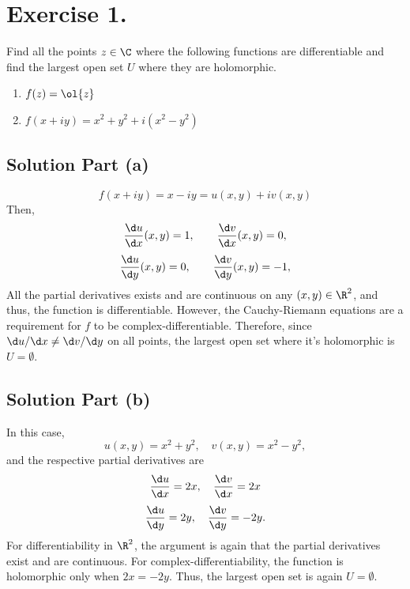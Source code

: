 \section*{Exercise 1.}

Find all the points $z\in\C$ where the following functions are differentiable and find the largest open set $U$ where they are holomorphic.
\begin{enumerate}[label=(\alph*)]
    \item $f(z) = \ol{z}$
    \item $ f(x+iy) = x^2 + y^2 + i(x^2 - y^2)$
\end{enumerate}

\subsection*{Solution Part (a)}

\[ f(x+iy) = x-iy = u(x,y) + i v(x,y) \]
Then,
\[ \frac{\d u}{\d x}(x,y) = 1,\hspace{2em} \frac{\d v}{\d x}(x,y) = 0, \]
\[ \frac{\d u}{\d y}(x,y) = 0,\hspace{2em} \frac{\d v}{\d y}(x,y) = -1, \]
All the partial derivatives exists and are continuous on any $(x,y)\in\R^2$, and thus, the function is differentiable. However, the Cauchy-Riemann equations are a requirement for $f$ to be complex-differentiable. Therefore, since $\d u/\d x \neq \d v/\d y$ on all points, the largest open set where it's holomorphic is $U = \emptyset$.

\subsection*{Solution Part (b)}

In this case,
\[ u(x,y) = x^2 + y^2,\hspace{1em} v(x,y) = x^2-y^2, \]
and the respective partial derivatives are
\[ \frac{\d u}{\d x} = 2x, \hspace{1em} \frac{\d v}{\d x} = 2x \]
\[ \frac{\d u}{\d y} = 2y, \hspace{1em} \frac{\d v}{\d y} = -2y. \]
For differentiability in $\R^2$, the argument is again that the partial derivatives exist and are continuous. For complex-differentiability, the function is holomorphic only when $2x = -2y$. Thus, the largest open set is again $U = \emptyset$.